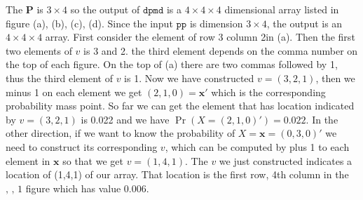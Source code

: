 \documentclass[12pt]{article}
\newcommand{\Pmat}{\mathbf{P}}
\newcommand{\xvec}{\boldsymbol{x}}
\newcommand{\code}{\texttt}
\begin{document}
The $\Pmat$ is $3 \times 4$ so the output of $\code{dpmd}$ is a $4 \times 4 \times 4$ dimensional array listed in figure (a), (b), (c), (d). Since the input $\code{pp}$ is dimension $3 \times 4$, the output is an $4 \times 4 \times 4$ array. First consider the element of row 3 column 2in (a). Then the first two elements of $v$ is 3 and 2. the third element depends on the comma number on the top of each figure. On the top of (a) there are two commas followed by 1, thus the third element of $v$ is 1. Now we have constructed $v = (3,2,1)$, then we minus 1 on each element we get $(2,1,0)=\xvec'$ which is the corresponding probability mass point. So far we can get the element that has location indicated by $v=(3,2,1)$ is 0.022 and we have $\Pr(X=(2,1,0)')=0.022$. In the other direction, if we want to know the probability of $X=\xvec=(0,3,0)'$ we need to construct its corresponding $v$, which can be computed by plus 1 to each element in $\xvec$ so that we get $v=(1,4,1)$. The $v$ we just constructed indicates a location of (1,4,1) of our array. That location is the first row, 4th column in the $\text{, , 1}$ figure which has value 0.006. 
\end{document}
